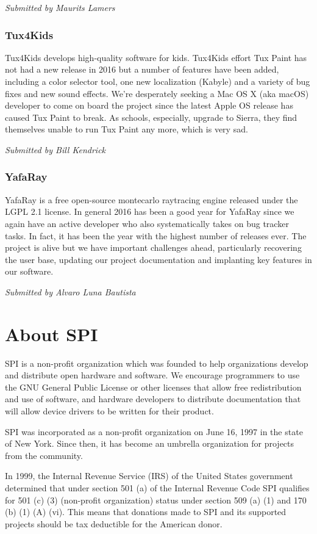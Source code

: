 \documentclass[letterpaper]{report}
\begin{document}
{\em Submitted by Maurits Lamers}

\subsection{Tux4Kids}

Tux4Kids develops high-quality software for kids.  Tux4Kids effort Tux
Paint has not had a new release in 2016 but a number of features have
been added, including a color selector tool, one new localization
(Kabyle) and a variety of bug fixes and new sound effects.  We're
desperately seeking a Mac OS X (aka macOS) developer to come on board
the project since the latest Apple OS release has caused Tux Paint to
break.  As schools, especially, upgrade to Sierra, they find themselves
unable to run Tux Paint any more, which is very sad.

{\em Submitted by Bill Kendrick}

\subsection{YafaRay}

YafaRay is a free open-source montecarlo raytracing engine released
under the LGPL 2.1 license.  In general 2016 has been a good year for
YafaRay since we again have an active developer who also systematically
takes on bug tracker tasks.  In fact, it has been the year with the
highest number of releases ever. The project is alive but we have
important challenges ahead, particularly recovering the user base,
updating our project documentation and implanting key features in our
software.

{\em Submitted by Alvaro Luna Bautista}


\appendix
\chapter{About SPI}

SPI is a non-profit organization which was founded to help organizations
develop and distribute open hardware and software. We encourage programmers
to use the GNU General Public License or other licenses that allow free
redistribution and use of software, and hardware developers to distribute
documentation that will allow device drivers to be written for their product.

SPI was incorporated as a non-profit organization on June 16, 1997 in the state
of New York. Since then, it has become an umbrella organization for projects
from the community.

In 1999, the Internal Revenue Service (IRS) of the United States government
determined that under section 501 (a) of the Internal Revenue Code SPI
qualifies for 501 (c) (3) (non-profit organization) status under section 509
(a) (1) and 170 (b) (1) (A) (vi). This means that donations made to SPI and its
supported projects should be tax deductible for the American donor.
\end{document}
